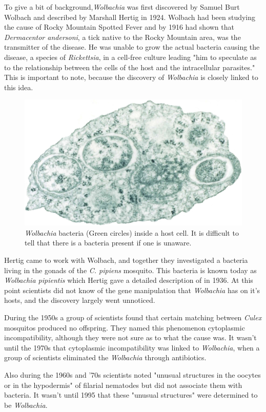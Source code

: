\documentclass[twocolumn]{article}
\begin{document}
To give a bit of background,\textit{Wolbachia} was first discovered by Samuel Burt Wolbach and described by Marshall Hertig in 1924.\cite{Winit} Wolbach had been studying the cause of Rocky Mountain Spotted Fever and by 1916 had shown that \textit{Dermacentor andersoni}, a tick native to the Rocky Mountain area, was the transmitter of the disease.\cite{wolbachia} He was unable to grow the actual bacteria causing the disease, a species of \textit{Rickettsia}, in a cell-free culture leading "him to speculate as to the relationship between the cells of the host and the intracellular parasites."\cite{wolbachia} This is important to note, because the discovery of \textit{Wolbachia} is closely linked to this idea.

\begin{figure}[!ht]
    \centering
    \includegraphics[width=.4\textwidth]{images/Wolbachia.png}
    \caption{\textit{Wolbachia} bacteria (Green circles) inside a host cell. It is difficult to tell that there is a bacteria present if one is unaware.\cite{Wwiki_image} }
    \label{fig:wolbachiha_tree}
\end{figure}

Hertig came to work with Wolbach, and together they investigated a bacteria living in the gonads of the \textit{C. pipiens} mosquito. This bacteria is known today as \textit{Wolbachia pipientis} which Hertig gave a detailed description of in 1936.\cite{Wdiscription} At this point scientists did not know of the gene manipulation that \textit{Wolbachia} has on it's hosts, and the discovery largely went unnoticed.

During the 1950s a group of scientists found that certain matching between \textit{Culex} mosquitos produced no offspring. They named this phenomenon cytoplasmic incompatibility, although they were not sure as to what the cause was.\cite{Wcyto_iso} It wasn't until the 1970s that cytoplasmic incompatibility was linked to \textit{Wolbachia}, when a group of scientists eliminated the \textit{Wolbachia} through antibiotics.\cite{Wcyto_cause}

Also during the 1960s and '70s scientists noted "unusual structures in the oocytes or in the hypodermis" of filarial nematodes but did not associate them with bacteria.\cite{wolbachia} It wasn't until 1995 that these "unusual structures" were determined to be \textit{Wolbachia}.\cite{Wstruct} 
\end{document}
